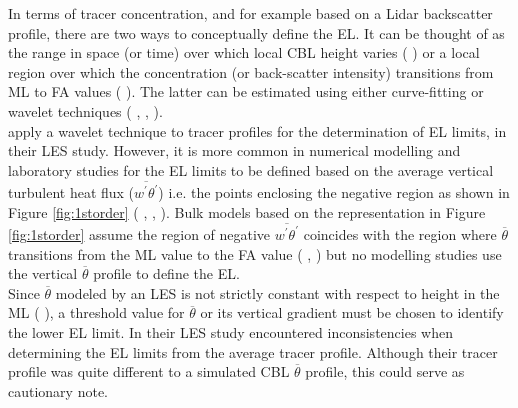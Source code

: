 In terms of tracer concentration, and for example based on a Lidar backscatter profile, there are two ways to conceptually define the \acs{EL}.  It can be thought of as the range in space (or time) over which local \acs{CBL} height varies (\citeauthor{CrumStullEl} \citeyear{CrumStullEl}) or a local region over which the concentration (or back-scatter intensity) transitions from \acs{ML} to \acs{FA} values (\citeauthor{Traum11} \citeyear{Traum11}).  The latter can be estimated using either curve-fitting or wavelet techniques (\citeauthor{Traum11} \citeyear{Traum11}, \citeauthor{SteynBaldHoff} \citeyear{SteynBaldHoff}, \citeauthor{BrooksFowler2} \citeyear{BrooksFowler2}).\\

\citeauthor{BrooksFowler2} apply a wavelet technique to tracer profiles for the determination of \acs{EL} limits, in their \citeyear{BrooksFowler2} \acs{LES} study.  However, it is more common in numerical modelling and laboratory studies for the \acs{EL} limits to be defined based on the average vertical turbulent heat flux ($\overline{w^{'}\theta^{'}}$) i.e. the points enclosing the negative region as shown in Figure \ref{fig:1storder} (\citeauthor{DearWill80} \citeyear{DearWill80}, \citeauthor{FedConzMir04} \citeyear{FedConzMir04}, \citeauthor{GarciaMellado} \citeyear{GarciaMellado}).  Bulk models based on the representation in Figure \ref{fig:1storder} assume the region of negative $\overline{w^{'}\theta^{'}}$ coincides with the region where $\overline{\theta}$ transitions from the \acs{ML} value to the \acs{FA} value (\citeauthor{Deardorff79} \citeyear{Deardorff79}, \citeauthor{FedConzMir04} \citeyear{FedConzMir04}) but no modelling studies use the vertical $\overline{\theta}$ profile to define the \acs{EL}.\\

Since $\overline{\theta}$ modeled by an \acs{LES} is not strictly constant with respect to height in the \acs{ML} (\citeauthor{FedConzMir04} \citeyear{FedConzMir04}), a threshold value for $\overline{\theta}$ or its vertical gradient must be chosen to identify the lower \acs{EL} limit.  In their \citeyear{BrooksFowler2} \acs{LES} study \citeauthor{BrooksFowler2} encountered inconsistencies when determining the \acs{EL} limits from the average tracer profile.  Although their tracer profile was quite different to a simulated \acs{CBL} $\overline{\theta}$ profile, this could serve as cautionary note.\\             

